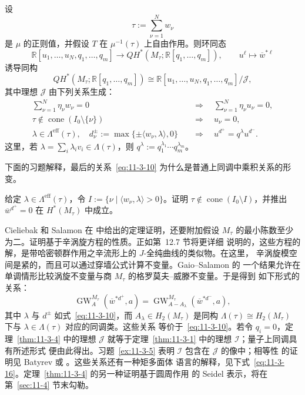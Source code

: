 \begin{theorem}\label{thm:11-3-4}
设
\[
  \tau:=\sum_{\nu=1}^Nw_\nu
\]
是 $\mu$ 的正则值，并假设 $T$ 在 $\mu^{-1}(\tau)$ 上自由作用。则环同态
\[
  \mathbb R[u_1,\ldots,u_N,q_1,\ldots,q_m]
  \longrightarrow QH^*(M_\tau;\mathbb R[q_1,\ldots,q_m]),
  \qquad u^\ell\longmapsto\overline w^{*\ell}
\]
诱导同构
\[
  QH^*(M_\tau;\mathbb R[q_1,\ldots,q_m])
  \cong
  \mathbb R[u_1,\ldots,u_N,q_1,\ldots,q_m]/\mathcal J,
\]
其中理想 $\mathcal J$ 由下列关系生成：
\begin{align}
  \sum_{\nu=1}^N\eta_\nu w_\nu=0
  &\quad\Longrightarrow\quad
  \sum_{\nu=1}^N\eta_\nu u_\nu=0,
  \label{eq:11-3-8}\\
  \tau\notin\operatorname{cone}(I_0\setminus\{\nu\})
  &\quad\Longrightarrow\quad u_\nu=0,
  \label{eq:11-3-9}\\
  \lambda\in\Lambda^{\mathrm{eff}}(\tau),\quad
  d_\nu^\pm:=\max\{\pm\langle w_\nu,\lambda\rangle,0\}
  &\quad\Longrightarrow\quad u^{d^+}=q^\lambda u^{d^-}.
  \label{eq:11-3-10}
\end{align}
这里，若 $\lambda=\sum_i\lambda_iv_i\in\Lambda(\tau)$，则
$q^\lambda:=q_1^{\lambda_1}\cdots q_m^{\lambda_m}$。
\end{theorem}

下面的习题解释，最后的关系~\eqref{eq:11-3-10} 为什么是普通上同调中乘积关系的形变。

\begin{exercise}\label{ex:11-3-5}
给定 $\lambda\in\Lambda^{\mathrm{eff}}(\tau)$，令
$I:=\{\nu\mid\langle w_\nu,\lambda\rangle>0\}$。证明
$\tau\notin\operatorname{cone}(I_0\setminus I)$，并推出
$\overline w^{d^+}=0$ 在 $H^*(M_\tau)$ 中成立。
\end{exercise}

Cieliebak 和 Salamon 在  中给出的定理证明，还要附加假设
$M_\tau$ 的最小陈数至少为二。证明基于辛涡旋方程的性质。正如第~12.7 节将更详细
说明的，这些方程的解，是带哈密顿群作用之辛流形上的 $J$-全纯曲线的类似物。在这里，
辛涡旋模空间是紧的，而且可以通过穿墙公式计算不变量。Gaio--Salamon  的
一个结果允许在单调情形比较涡旋不变量与商 $M_\tau$ 的格罗莫夫--威滕不变量。于是得到
如下形式的关系：
\[
  \operatorname{GW}_{A}^{M_\tau}(\overline w^{*d^+},a)
  =\operatorname{GW}_{A-A_\lambda}^{M_\tau}(\overline w^{*d^-},a),
\]
其中 $\lambda$ 与 $d^\pm$ 如式~\eqref{eq:11-3-10}，而
$A_\lambda\in H_2(M_\tau)$ 是同构
$\Lambda(\tau)\cong H_2(M_\tau)$ 下与 $\lambda\in\Lambda(\tau)$ 对应的同调类。这些关系
等价于~\eqref{eq:11-3-10}。若令 $q_i=0$，定理~\ref{thm:11-3-4} 中的理想
$\mathcal J$ 就等于定理~\ref{thm:11-3-1} 中的理想 $\mathcal I$；量子上同调具有所述形式
便由此得出。习题~\ref{ex:11-3-5} 表明 $\mathcal I$ 包含在 $\mathcal J$ 的像中；相等性
的证明见 Batyrev  或 。这些关系还有一种矩多面体
语言的解释，见下式~\eqref{eq:11-3-16}。定理~\ref{thm:11-3-4} 的另一种证明基于圆周作用
的 Seidel 表示，将在第~\ref{sec:11-4} 节末勾勒。

